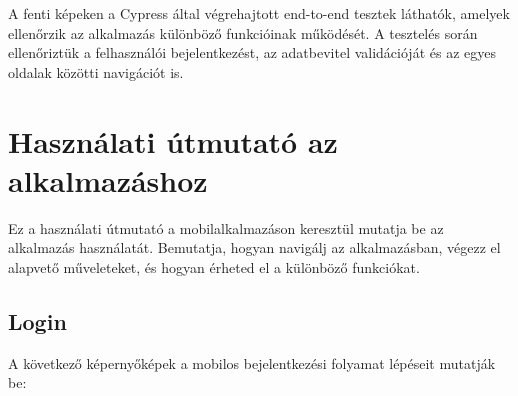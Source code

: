 \documentclass[12pt]{report}
\begin{document}
A fenti képeken a Cypress által végrehajtott end-to-end tesztek láthatók, amelyek ellenőrzik az alkalmazás különböző funkcióinak működését. A tesztelés során ellenőriztük a felhasználói bejelentkezést, az adatbevitel validációját és az egyes oldalak közötti navigációt is.

\chapter{Használati útmutató az alkalmazáshoz}
Ez a használati útmutató a mobilalkalmazáson keresztül mutatja be az alkalmazás használatát. Bemutatja, hogyan navigálj az alkalmazásban, végezz el alapvető műveleteket, és hogyan érheted el a különböző funkciókat.
\section{Login}
A következő képernyőképek a mobilos bejelentkezési folyamat lépéseit mutatják be:
\end{document}
